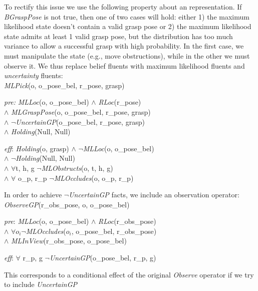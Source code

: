 To rectify this issue we use the following property about an \mld{}
representation. If \emph{BGraspPose} is not true, then one of two
cases will hold: either 1) the maximum likelihood state doesn't contain a valid grasp pose or 2) the maximum likelihood state admits at least 1 valid grasp pose, but the distribution has too much variance to allow
a successful grasp with high probability. In the first case, we must
manipulate the state (e.g., move obstructions), while in the other we must observe it. We
thus replace belief fluents with maximum likelihood fluents and
\emph{uncertainty} fluents:\\
\emph{MLPick}(o, o\_pose\_bel, r\_pose, grasp)
\vspace{-2pt}
\begin{tightlist}
\item[\emph{pre:}] \emph{MLLoc}(o, o\_pose\_bel) $\wedge$
  \emph{RLoc}(r\_pose) \\$\wedge$ \emph{MLGraspPose}(o,
  o\_pose\_bel, r\_pose, grasp) \\$\wedge$
  $\lnot$\emph{UncertainGP}(o\_pose\_bel, r\_pose, grasp)\\$\wedge$
  \emph{Holding}(Null, Null)
\item[\emph{eff}:] \emph{Holding}(o, grasp) $\wedge$
  $\lnot$\emph{MLLoc}(o, o\_pose\_bel) \\$\wedge$
  $\lnot$\emph{Holding}(Null, Null) \\$\wedge$ $\forall$t, h, g
  $\lnot$\emph{MLObstructs}(o, t, h, g)\\ $\wedge$ $\forall$ o\_p,
  r\_p $\lnot$\emph{MLOccludes}(o, o\_p, r\_p)
\end{tightlist}
In order to achieve $\lnot$\emph{UncertainGP} facts, we include an
observation operator:\\
\emph{ObserveGP}(r\_obs\_pose, o, o\_pose\_bel)
\begin{tightlist}
  \item[\emph{pre}:] \emph{MLLoc}(o, o\_pose\_bel) $\wedge$
    \emph{RLoc}(r\_obs\_pose) \\$\wedge$ $\forall o_i
    \lnot$\emph{MLOccludes}($o_i$, o\_pose\_bel, r\_obs\_pose) \\ $\wedge$
    \emph{MLInView}(r\_obs\_pose, o\_pose\_bel)
  \item[\emph{eff}:] $\forall$ r\_p, g $\lnot$\emph{UncertainGP}(o\_pose\_bel, r\_p, g)
\end{tightlist}
This corresponds to a conditional effect of the original
\emph{Observe} operator if we try to include \emph{UncertainGP}
